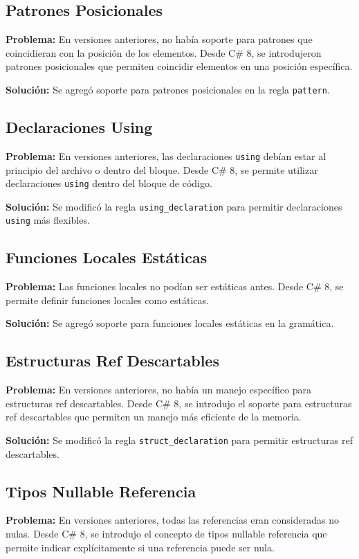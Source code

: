 \subsection{Patrones Posicionales}
\textbf{Problema:} En versiones anteriores, no había soporte para patrones que coincidieran con la posición de los elementos. Desde C\# 8, se introdujeron patrones posicionales que permiten coincidir elementos en una posición específica.

\textbf{Solución:} Se agregó soporte para patrones posicionales en la regla \texttt{pattern}.

\subsection{Declaraciones Using}
\textbf{Problema:} En versiones anteriores, las declaraciones \texttt{using} debían estar al principio del archivo o dentro del bloque. Desde C\# 8, se permite utilizar declaraciones \texttt{using} dentro del bloque de código.

\textbf{Solución:} Se modificó la regla \texttt{using\_declaration} para permitir declaraciones \texttt{using} más flexibles.

\subsection{Funciones Locales Estáticas}
\textbf{Problema:} Las funciones locales no podían ser estáticas antes. Desde C\# 8, se permite definir funciones locales como estáticas.

\textbf{Solución:} Se agregó soporte para funciones locales estáticas en la gramática.

\subsection{Estructuras Ref Descartables}
\textbf{Problema:} En versiones anteriores, no había un manejo específico para estructuras ref descartables. Desde C\# 8, se introdujo el soporte para estructuras ref descartables que permiten un manejo más eficiente de la memoria.

\textbf{Solución:} Se modificó la regla \texttt{struct\_declaration} para permitir estructuras ref descartables.

\subsection{Tipos Nullable Referencia}
\textbf{Problema:} En versiones anteriores, todas las referencias eran consideradas no nulas. Desde C\# 8, se introdujo el concepto de tipos nullable referencia que permite indicar explícitamente si una referencia puede ser nula.

